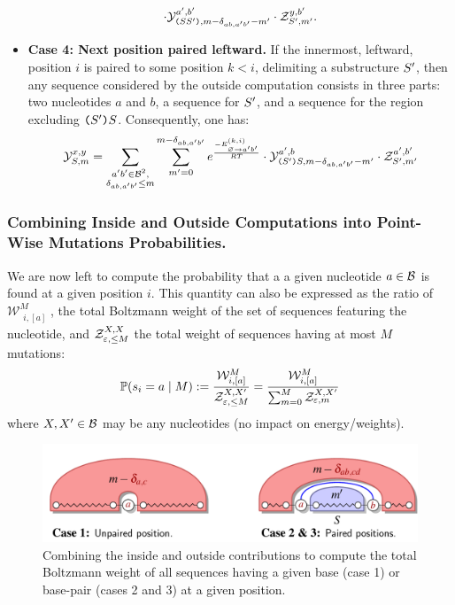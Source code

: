 \begin{itemize}
\begin{equation}
		 \cdot\mathcal{Y}_{\text{\tt(}S S'\text{\tt )}, m- \delta_{ab,a'b'} - m'}^{a',b'}
     \cdot\mathcal{Z}_{S', m'}^{y,b'} .
\label{eq:Y_rec_C}
\end{equation}
\item {\bf Case 4: Next position paired leftward.} If the innermost, leftward, position $i$ is paired to some position $k<i$, delimiting a substructure $S'$, then any sequence considered by the outside computation consists in three parts: two nucleotides $a$ and $b$, a sequence for $S'$, and a sequence for the region excluding $\text{\tt(}S'\text{\tt )}S$. Consequently, one has:
\begin{equation}
	\mathcal{Y}_{S, m}^{x,y} = 
		 \sum_{\substack{a'b'\in \mathcal{B}^2,\\ \delta_{ab,a'b'}\le m}}
		 \sum_{m'=0}^{m-\delta_{ab,a'b'}}
   	 e^{\frac{-E^{(k,i)}_{{\varnothing}\to{a'b'}}}{RT}}
		 \cdot\mathcal{Y}_{\text{\tt(}S'\text{\tt )}S, m- \delta_{ab,a'b'} - m'}^{a',b}
     \cdot\mathcal{Z}_{S', m'}^{a',b'}
\label{eq:Y_rec_D}
\end{equation}
\end{itemize}

\subsubsection{Combining Inside and Outside Computations into Point-Wise Mutations Probabilities.}


We are now left to compute the probability that a a given nucleotide $a\in\mathcal{B}$ is found at a given position $i$.
This quantity can also be expressed as the ratio of $\mathcal{W}^M_{\substack{i, [a]}}$, the total Boltzmann weight 
of the set of sequences featuring the nucleotide, and $\mathcal{Z}_{\varepsilon, \le M}^{X,X}$ the total weight of sequences having at most $M$ mutations:
\begin{equation}
	\mathbb{P}(s_i = a\;|\; M) := \frac{\mathcal{W}^M_{\substack{i, [a]}}}{\mathcal{Z}_{\varepsilon, \le M}^{X,X'}} = \frac{\mathcal{W}^M_{\substack{i, [a]}}}{\sum_{m=0}^{M}\mathcal{Z}_{\varepsilon, m}^{X,X'}}\label{eq:normalize}
\end{equation}
where $X,X'\in\mathcal{B}$ may be any nucleotides (no impact on energy/weights).

\begin{figure}[t]\centering
\includegraphics[scale=\ScaleDP]{Figure3-FigDPCombineWrapper}
\caption{Combining the inside and outside contributions to compute the total Boltzmann weight of all sequences having a given base (case 1) or base-pair (cases 2 and 3) at a given position.\label{fig:combine}}
\end{figure}

